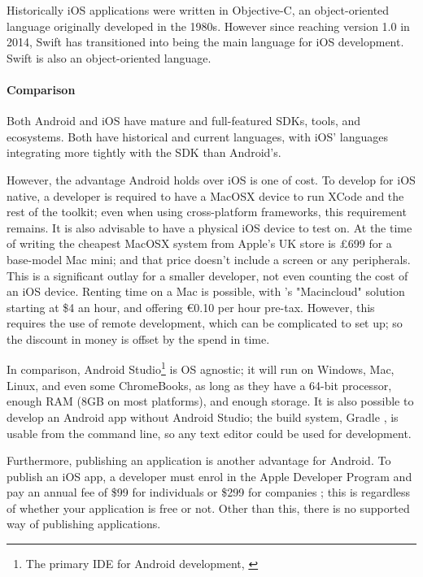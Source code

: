 \documentclass[11pt, a4paper, notitlepage]{report}
\begin{document}
Historically iOS applications were written in Objective-C, an object-oriented language originally developed in the 1980s. However since reaching version 1.0 in 2014, Swift \citep{Swift1.0} has transitioned into being the main language for iOS development. Swift is also an object-oriented language.

\paragraph{Comparison} Both Android and iOS have mature and full-featured SDKs, tools, and ecosystems. Both have historical and current languages, with iOS' languages integrating more tightly with the SDK than Android's.

However, the advantage Android holds over iOS is one of cost. To develop for iOS native, a developer is required to have a MacOSX device to run XCode and the rest of the toolkit; even when using cross-platform frameworks, this requirement remains. It is also advisable to have a physical iOS device to test on. At the time of writing the cheapest MacOSX system from Apple's UK store is £699 for a base-model Mac mini; and that price doesn't include a screen or any peripherals. This is a significant outlay for a smaller developer, not even counting the cost of an iOS device. Renting time on a Mac is possible, with \citet{MIAC}'s "Macincloud" solution starting at \$4 an hour, and \citet{scalewayM1} offering €0.10 per hour pre-tax. However, this requires the use of remote development, which can be complicated to set up; so the discount in money is offset by the spend in time.

In comparison, Android Studio\footnote{The primary IDE for Android development, \citep{androidstudio}} is OS agnostic; it will run on Windows, Mac, Linux, and even some ChromeBooks, as long as they have a 64-bit processor, enough RAM (8GB on most platforms), and enough storage. It is also possible to develop an Android app without Android Studio; the build system, Gradle \citep{gradle}, is usable from the command line, so any text editor could be used for development.

Furthermore, publishing an application is another advantage for Android. To publish an iOS app, a developer must enrol in the Apple Developer Program and pay an annual fee of \$99 for individuals or \$299 for companies \citep{AppleDevProgram}; this is regardless of whether your application is free or not. Other than this, there is no supported way of publishing applications.
\end{document}
